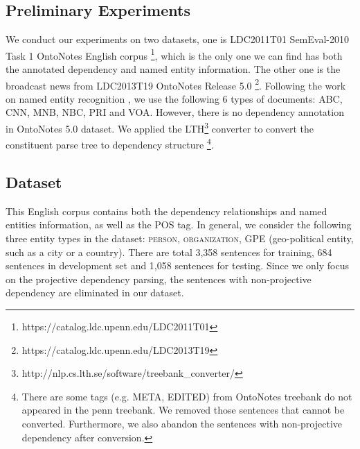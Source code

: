 \subsection{Preliminary Experiments}
We conduct our experiments on two datasets, one is LDC2011T01 SemEval-2010 Task 1 OntoNotes English corpus \footnote{https://catalog.ldc.upenn.edu/LDC2011T01}, which is the only one we can find has both the annotated dependency and named entity information. 
The other one is the broadcast news from LDC2013T19 OntoNotes Release 5.0 \footnote{https://catalog.ldc.upenn.edu/LDC2013T19}. Following the work on named entity recognition \cite{finkel2009joint}, we use the following 6 types of documents: ABC, CNN, MNB, NBC, PRI and VOA. 
However, there is no dependency annotation in OntoNotes 5.0 dataset. 
We applied the LTH\footnote{http://nlp.cs.lth.se/software/treebank\_converter/} converter \cite{johansson2007a} to convert the constituent parse tree to dependency structure \footnote{There are some tags (e.g. META, EDITED) from OntoNotes treebank do not appeared in the penn treebank. We removed those sentences that cannot be converted. Furthermore, we also abandon the sentences with non-projective dependency after conversion.}. 



\subsection{Dataset}
This English corpus contains both the dependency relationships and named entities information, as well as the POS tag. In general, we consider the following three entity types in the dataset: \textsc{person}, \textsc{organization}, \textsc{GPE} (geo-political entity, such as a city or a country). 
There are total 3,358 sentences for training, 684 sentences in development set and 1,058 sentences for testing. 
Since we only focus on the projective dependency parsing, the sentences with non-projective dependency are eliminated in our dataset. 

